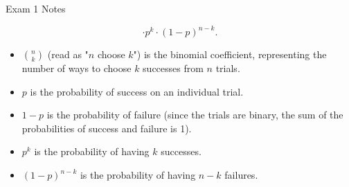 \begin{examnotes}{Exam 1 Notes}
\begin{itemize}
\begin{itemize}
\begin{equation*}
                \cdot p^{k} \cdot (1 - p)^{n - k}.
            \end{equation*}
            \begin{itemize}
                \item $\binom{n}{k}$ (read as "$n$ choose $k$") is the binomial coefficient, representing the number of ways to choose $k$ successes from $n$ trials.
                \item $p$ is the probability of success on an individual trial.
                \item $1 - p$ is the probability of failure (since the trials are binary, the sum of the probabilities of success and failure is 1).
                \item $p^{k}$ is the probability of having $k$ successes.
                \item $(1 - p)^{n - k}$ is the probability of having $n - k$ failures.
            \end{itemize}
        \end{itemize}
    \end{itemize}
\end{examnotes}